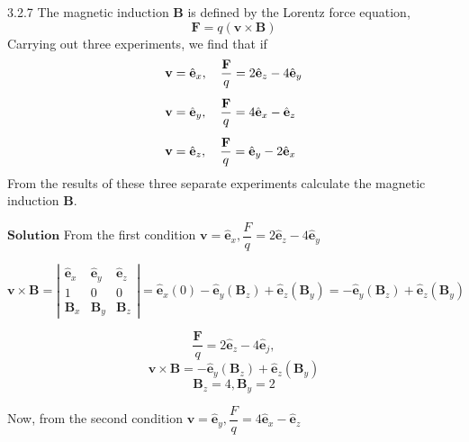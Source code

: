 \documentclass{article}
\begin{document}
\begin{flushleft}
\begin{mybox}{3.2.7}
The magnetic induction $\mathbf{B}$ is defined by the Lorentz force equation,
$$
\mathbf{F}=q(\mathbf{v} \times \mathbf{B})
$$
Carrying out three experiments, we find that if
$$
\begin{array}{l}{\mathbf{v}=\hat{\mathbf{e}}_{x}, \quad \dfrac{\mathbf{F}}{q}=2 \hat{\mathbf{e}}_{z}-4 \hat{\mathbf{e}}_{y}}\vspace{3mm} \\ {\mathbf{v}=\hat{\mathbf{e}}_{y}, \quad \dfrac{\mathbf{F}}{q}=4 \hat{\mathbf{e}}_{x}-\hat{\mathbf{e}}_{z}} \vspace{3mm}\\ {\mathbf{v}=\hat{\mathbf{e}}_{z}, \quad \dfrac{\mathbf{F}}{q}=\hat{\mathbf{e}}_{y}-2 \hat{\mathbf{e}}_{x}}\end{array}
$$
From the results of these three separate experiments calculate the magnetic induction $\mathbf{B}$.
\end{mybox}



$\boxed{\textbf{Solution}}$ From the first condition $\mathbf{v}=\hat{\mathbf{e}}_{x}, \dfrac{F}{q}=2 \hat{\mathbf{e}}_{z}-4 \hat{\mathbf{e}}_{\dot{y}}$

$$
\mathbf{v} \times \mathbf{B}=\left|\begin{array}{ccc}
\hat{\mathbf{e}}_{x} & \hat{\mathbf{e}}_{y} & \hat{\mathbf{e}}_{z} \\
1 & 0 & 0 \\
\mathbf{B}_{x} & \mathbf{B}_{y} & \mathbf{B}_{z}
\end{array}\right|=\hat{\mathbf{e}}_{x}(0)-\hat{\mathbf{e}}_{y}\left(\mathbf{B}_{z}\right)+\hat{\mathbf{e}}_{z}\left(\mathbf{B}_{y}\right)=-\hat{\mathbf{e}}_{y}\left(\mathbf{B}_{z}\right)+\hat{\mathbf{e}}_{z}\left(\mathbf{B}_{y}\right)
$$

$$\frac{\mathbf{F}}{q}=2 \hat{\mathbf{e}}_{z}-4 \hat{\mathbf{e}}_{j},$$
$$ \mathbf{v} \times \mathbf{B}=-\hat{\mathbf{e}}_{y}\left(\mathbf{B}_{z}\right)+\hat{\mathbf{e}}_{z}\left(\mathbf{B}_{y}\right)$$
$$\mathbf{B}_{z}=4, \mathbf{B}_{y}=2$$

Now, from the second condition $\mathbf{v}=\hat{\mathbf{e}}_{y}, \dfrac{F}{q}=4 \hat{\mathbf{e}}_{x}-\hat{\mathbf{e}}_{z}$


\end{flushleft}
\end{document}
